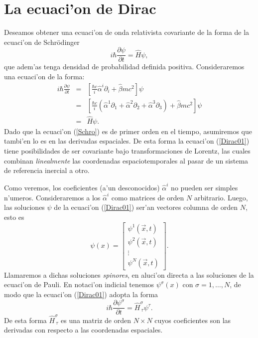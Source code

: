\chapter{La ecuaci'on de Dirac}

Deseamos obtener una ecuaci'on de onda relativista covariante de la forma
de la ecuaci'on de Schr\"{o}dinger 
\begin{equation}
i\hbar \frac{\partial \psi }{\partial t}=\hat{H}\psi,
\label{Schro}
\end{equation}
que adem'as tenga densidad de probabilidad definida positiva. Consideraremos una
ecuaci'on de la forma:
\begin{eqnarray}
i\hbar \frac{\partial \psi }{\partial t}&=&\left[ \frac{\hbar c}{i} 
\hat{\alpha}^i\partial_i +\hat{\beta}mc^2\right] \psi \label{Dirac1}\\
&=&\left[ \frac{\hbar c}{i}\left( 
\hat{\alpha}^1\partial_1+\hat{\alpha}^2\partial_2+\hat{\alpha}^{3}
\partial_3\right) +\hat{\beta}mc^2\right] \psi \\
&=& \hat{H}\psi .
\label{Dirac01}
\end{eqnarray}
Dado que la ecuaci'on (\ref{Schro}) es de primer orden en el tiempo, asumiremos
que tambi'en lo es en las derivadas espaciales. De esta forma la ecuaci'on
(\ref{Dirac01}) tiene posibilidades de ser covariante bajo transformaciones de
Lorentz, las cuales combinan \textit{linealmente} las coordenadas
espaciotemporales al pasar de un sistema de referencia inercial a otro.

Como veremos, los coeficientes (a'un desconocidos) $\hat{\alpha}^i$ no pueden
ser simples n'umeros. Consideraremos a los $\hat{\alpha}^i$ como matrices de
orden
$N$ arbitrario. Luego, las soluciones $\psi$ de la ecuaci'on (\ref{Dirac01})
ser'an vectores columna de orden $N$, esto es 
\begin{equation}
\psi (x) =\left[ 
\begin{array}{c}
\psi^1\left( \vec{x},t\right) \\ 
\psi^2\left( \vec{x},t\right) \\ 
\vdots \\ 
\psi^{N}\left( \vec{x},t\right)
\end{array}
\right].
\end{equation}
Llamaremos a dichas soluciones \textit{spinores}, en aluci'on directa a las
soluciones de la ecuaci'on de Pauli. En notaci'on indicial tenemos $\psi^\sigma
(x)$ con $\sigma=1,\ldots,N$, de modo que la ecuaci'on (\ref{Dirac01}) adopta la
forma 
\begin{equation}
i\hbar \frac{\partial \psi^{\sigma }}{\partial t}=\hat{H}^\sigma_{\ \tau}
\psi^{\tau }.
\end{equation}
De esta forma $\hat{H}^\sigma_{\ \tau}$ es una matriz de orden $N\times N$ cuyos
coeficientes son las derivadas con respecto a las coordenadas espaciales.

